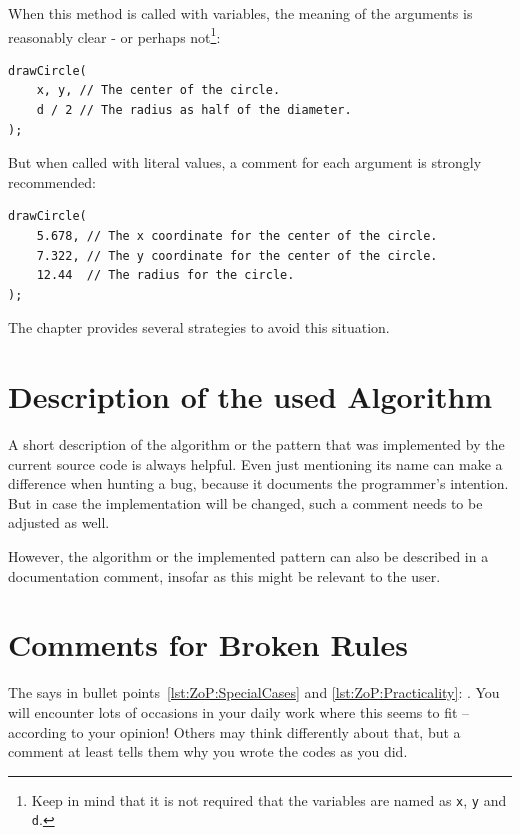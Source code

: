 When this method is called with variables, the meaning of the arguments is reasonably clear - or perhaps not\footnote{Keep in mind that it is not required that the variables are named as \lstinline|x|, \lstinline|y| and \lstinline|d|.}:
\begin{lstlisting}
drawCircle(
    x, y, // The center of the circle.
    d / 2 // The radius as half of the diameter.
);
\end{lstlisting}

But when called with literal values, a comment for each argument is strongly recommended:
\begin{lstlisting}
drawCircle(
    5.678, // The x coordinate for the center of the circle. 
    7.322, // The y coordinate for the center of the circle.
    12.44  // The radius for the circle.
);
\end{lstlisting}

The chapter  provides several strategies to avoid this situation.


\section{Description of the used Algorithm}
A short description of the algorithm or the pattern that was implemented by the current source code is always helpful. Even just mentioning its name can make a difference when hunting a bug, because it documents the programmer's intention. But in case the implementation will be changed, such a comment needs to be adjusted as well.

However, the algorithm or the implemented pattern can also be described in a documentation comment, insofar as this might be relevant to the user.


\section{Comments for Broken Rules}\label{sec:CommentsForBrokenRules}
The \ngref{} says in bullet points~\ref{lst:ZoP:SpecialCases} and \ref{lst:ZoP:Practicality}: . You will encounter lots of occasions in your daily work where this seems to fit – according to your opinion! Others may think differently about that, but a comment at least tells them why you wrote the codes as you did.

